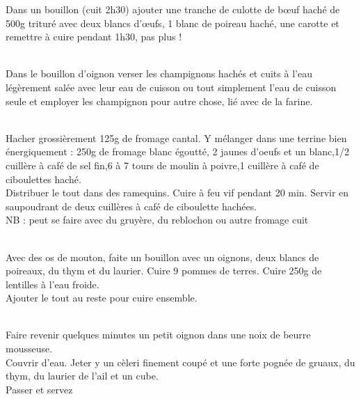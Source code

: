 \begin{minipage}[c]{\textwidth}
Dans un bouillon (cuit 2h30) ajouter une tranche de culotte de bœuf haché de 500g trituré avec deux blancs d'œufs, 1 blanc de poireau haché, une carotte et remettre à cuire pendant 1h30, pas plus !\\
\\

\end{minipage}

\begin{minipage}[c]{\textwidth}
Dans le bouillon d'oignon verser les champignons hachés et cuits à l'eau légèrement salée avec leur eau de cuisson ou tout simplement l'eau de cuisson seule et employer les champignon pour autre chose, lié avec de la farine.\\
\\

\end{minipage}

\begin{minipage}[c]{\textwidth}
Hacher grossièrement 125g de fromage cantal. Y mélanger dans une terrine bien énergiquement : 250g de fromage blanc égoutté, 2 jaunes d'oeufs et un blanc,1/2 cuillère à café de sel fin,6 à 7 tours de moulin à poivre,1 cuillère à café de ciboulettes haché.\\
Distribuer le tout dans des ramequins. Cuire à feu vif pendant 20 min. Servir en saupoudrant de deux cuillères à café de ciboulette hachées.\\
NB : peut se faire avec du gruyère, du reblochon ou autre fromage cuit\\
\\

\end{minipage}

\begin{minipage}[c]{\textwidth}
Avec des os de mouton, faite un bouillon avec un oignons, deux blancs de poireaux, du thym et du laurier. Cuire 9 pommes de terres. Cuire 250g de lentilles à l'eau froide.\\
Ajouter le tout au reste pour cuire ensemble.\\
\\

\end{minipage}

\begin{minipage}[c]{\textwidth}
Faire revenir quelques minutes un petit oignon dans une noix de beurre mousseuse.\\
Couvrir d'eau. Jeter y un cèleri finement coupé et une forte pognée de gruaux, du thym, du laurier de l’ail et un cube.\\
Passer et servez\\
\\

\end{minipage}

